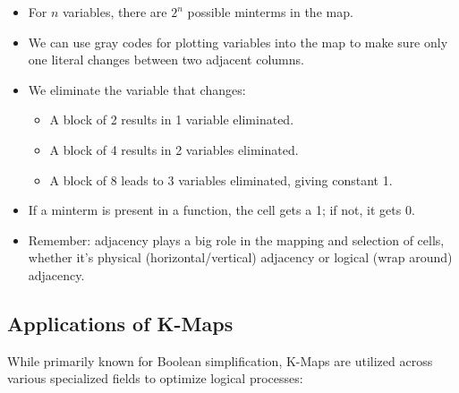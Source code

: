 \begin{itemize}
    \item For $n$ variables, there are $2^n$ possible minterms in the map.
    \item We can use gray codes for plotting variables into the map to make sure 
    only one literal changes between two adjacent columns.
    \item We eliminate the variable that changes:
    \begin{itemize}
        \item A block of 2 results in 1 variable eliminated.
        \item A block of 4 results in 2 variables eliminated.
        \item A block of 8 leads to 3 variables eliminated, giving constant 1.
    \end{itemize}
    \item If a minterm is present in a function, the cell gets a 1; if not, it 
    gets 0.
    \item Remember: adjacency plays a big role in the mapping and selection of 
    cells, whether it's physical (horizontal/vertical) adjacency or logical 
    (wrap around) adjacency.
\end{itemize}

\subsection{Applications of K-Maps}

While primarily known for Boolean simplification, K-Maps are utilized across various specialized fields to optimize logical processes\cite{angadi2025review}:

